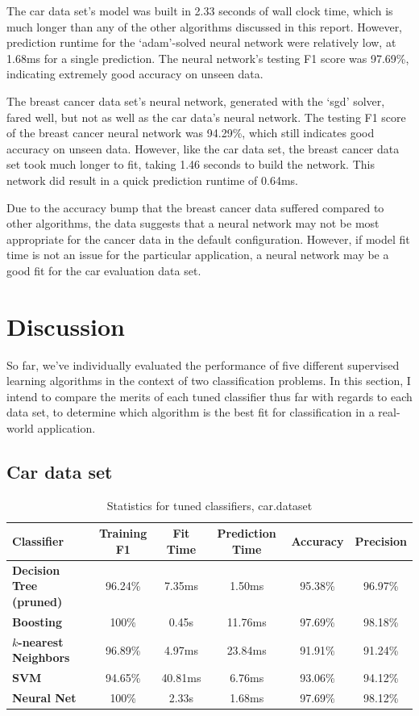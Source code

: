 \documentclass{article}
\begin{document}
    The car data set's model was built in 2.33 seconds of wall clock time, which is much longer than any of the other algorithms discussed in this report. However, prediction runtime for the `adam'-solved neural network were relatively low, at 1.68ms for a single prediction. The neural network's testing F1 score was 97.69\%, indicating extremely good accuracy on unseen data.

    The breast cancer data set's neural network, generated with the `sgd' solver, fared well, but not as well as the car data's neural network. The testing F1 score of the breast cancer neural network was 94.29\%, which still indicates good accuracy on unseen data. However, like the car data set, the breast cancer data set took much longer to fit, taking 1.46 seconds to build the network. This network did result in a quick prediction runtime of 0.64ms.

    Due to the accuracy bump that the breast cancer data suffered compared to other algorithms, the data suggests that a neural network may not be most appropriate for the cancer data in the default configuration. However, if model fit time is not an issue for the particular application, a neural network may be a good fit for the car evaluation data set.

    \section{Discussion}
    So far, we've individually evaluated the performance of five different supervised learning algorithms in the context of two classification problems. In this section, I intend to compare the merits of each tuned classifier thus far with regards to each data set, to determine which algorithm is the best fit for classification in a real-world application.

    \subsection{Car data set}

    \begin{table}[h!]
    \centering
    \begin{tabular}{||l c c c c c||} 
     \hline
     \textbf{Classifier} & Training F1 & Fit Time & Prediction Time & Accuracy & Precision \\
     \hline
     \textbf{Decision Tree (pruned)} & 96.24\% & 7.35ms & 1.50ms & 95.38\% & 96.97\% \\ 
     \textbf{Boosting} & 100\% & 0.45s & 11.76ms & 97.69\% & 98.18\% \\
     \textbf{$k$-nearest Neighbors} & 96.89\% & 4.97ms & 23.84ms & 91.91\% & 91.24\% \\
     \textbf{SVM} & 94.65\% & 40.81ms & 6.76ms & 93.06\% & 94.12\% \\
     \textbf{Neural Net} & 100\% & 2.33s & 1.68ms & 97.69\% & 98.12\% \\
     \hline
    \end{tabular}
    \caption{Statistics for tuned classifiers, car.dataset}
    \label{tab:car-stats}
    \end{table}
\end{document}
